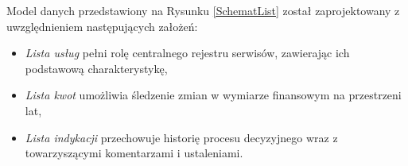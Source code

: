 

Model danych przedstawiony na Rysunku \ref{SchematList} został zaprojektowany z uwzględnieniem następujących założeń:

\begin{itemize}
  \item \emph{Lista usług} pełni rolę centralnego rejestru serwisów, zawierając ich podstawową charakterystykę,
  \item \emph{Lista kwot} umożliwia śledzenie zmian w wymiarze finansowym na przestrzeni lat,
  \item \emph{Lista indykacji} przechowuje historię procesu decyzyjnego wraz z towarzyszącymi komentarzami i ustaleniami.
\end{itemize}



